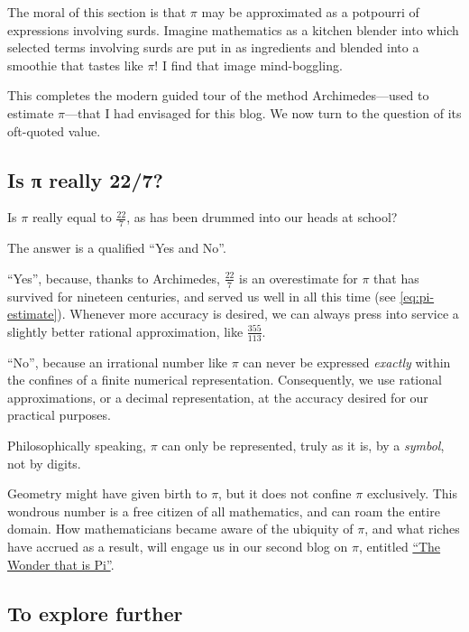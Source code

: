 \documentclass[
  a4paper,
]{article}
\begin{document}
The moral of this section is that \(\pi\) may be approximated as a
potpourri of expressions involving surds. Imagine mathematics as a
kitchen blender into which selected terms involving surds are put in as
ingredients and blended into a smoothie that tastes like \(\pi\)! I find
that image mind-boggling.

This completes the modern guided tour of the method Archimedes---used to
estimate \(\pi\)---that I had envisaged for this blog. We now turn to
the question of its oft-quoted value.

\subsection{Is π really 22/7?}\label{is-ux3c0-really-227}

Is \(\pi\) really equal to \(\frac{22}{7}\), as has been drummed into
our heads at school?

The answer is a qualified ``Yes and No''.

``Yes'', because, thanks to Archimedes, \(\frac{22}{7}\) is an
overestimate for \(\pi\) that has survived for nineteen centuries, and
served us well in all this time (see \cref{eq:pi-estimate}). Whenever
more accuracy is desired, we can always press into service a slightly
better rational approximation, like
\href{https://en.wikipedia.org/wiki/Mil\%C3\%BC}{\(\frac{355}{113}\)}.

``No'', because an irrational number like \(\pi\) can never be expressed
\emph{exactly} within the confines of a finite numerical representation.
Consequently, we use rational approximations, or a decimal
representation, at the accuracy desired for our practical purposes.

Philosophically speaking, \(\pi\) can only be represented, truly as it
is, by a \emph{symbol}, not by digits.

Geometry might have given birth to \(\pi\), but it does not confine
\(\pi\) exclusively. This wondrous number is a free citizen of all
mathematics, and can roam the entire domain. How mathematicians became
aware of the ubiquity of \(\pi\), and what riches have accrued as a
result, will engage us in our second blog on \(\pi\), entitled
\href{https://swanlotus.netlify.app/blogs/the-wonder-that-is-pi}{``The
Wonder that is Pi''}.

\subsection{To explore further}\label{to-explore-further}
\end{document}
